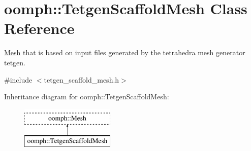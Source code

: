 \hypertarget{classoomph_1_1TetgenScaffoldMesh}{}\section{oomph\+:\+:Tetgen\+Scaffold\+Mesh Class Reference}
\label{classoomph_1_1TetgenScaffoldMesh}


\hyperlink{classoomph_1_1Mesh}{Mesh} that is based on input files generated by the tetrahedra mesh generator tetgen.  




{\ttfamily \#include $<$tetgen\+\_\+scaffold\+\_\+mesh.\+h$>$}

Inheritance diagram for oomph\+:\+:Tetgen\+Scaffold\+Mesh\+:\begin{figure}[H]
\begin{center}
\leavevmode
\includegraphics[height=2.000000cm]{classoomph_1_1TetgenScaffoldMesh}
\end{center}
\end{figure}
